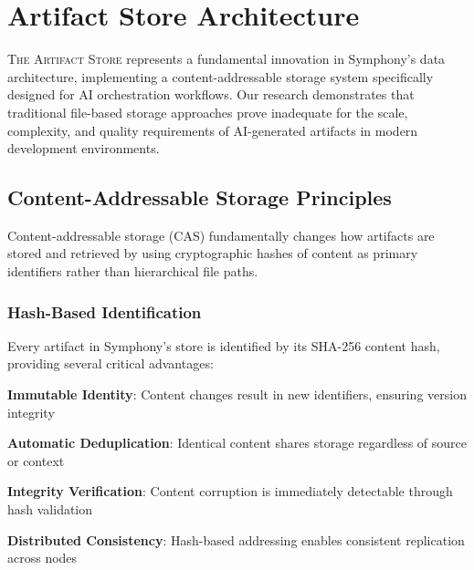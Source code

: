 
\section*{Artifact Store Architecture}

\lettrine{T}{he Artifact Store} represents a fundamental innovation in Symphony's data architecture, implementing a content-addressable storage system specifically designed for AI orchestration workflows. Our research demonstrates that traditional file-based storage approaches prove inadequate for the scale, complexity, and quality requirements of AI-generated artifacts in modern development environments.

\subsection*{Content-Addressable Storage Principles}

Content-addressable storage (CAS) fundamentally changes how artifacts are stored and retrieved by using cryptographic hashes of content as primary identifiers rather than hierarchical file paths.

\subsubsection*{Hash-Based Identification}

Every artifact in Symphony's store is identified by its SHA-256 content hash, providing several critical advantages:

\begin{expandedlist}
    \item \textbf{Immutable Identity}: Content changes result in new identifiers, ensuring version integrity
    \item \textbf{Automatic Deduplication}: Identical content shares storage regardless of source or context
    \item \textbf{Integrity Verification}: Content corruption is immediately detectable through hash validation
    \item \textbf{Distributed Consistency}: Hash-based addressing enables consistent replication across nodes
\end{expandedlist}

